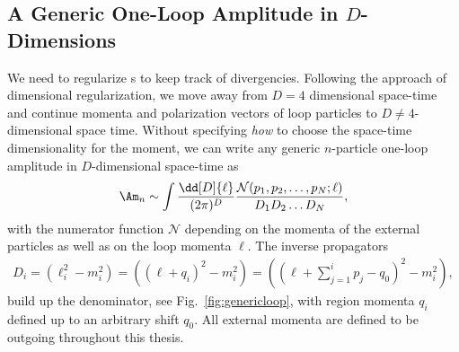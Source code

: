\subsection{A Generic One-Loop Amplitude in $D$-Dimensions}
\label{sec:genloop}
We need to regularize \ola s to keep track of divergencies. Following
the approach of dimensional regularization, we move away from $D=4$
dimensional space-time and continue momenta and polarization vectors
of loop particles to $D\neq 4$-dimensional space time. Without
specifying \textit{how} to choose the space-time dimensionality for the moment, we can write any generic $n$-particle one-loop
amplitude in $D$-dimensional space-time as
\begin{align}\label{eq:genericola}
\Am_n \sim \int \frac{\dd[D]{\ell}}{(2\pi)^{D}} \frac{\mathcal{N}(p_1,p_2,\dots,p_N;\ell)}{D_1D_2\dots D_N},
\end{align}
with the numerator function $\mathcal{N}$ depending on the
momenta of the external particles as well as on the loop momenta $\ell$. The inverse propagators 
\begin{align}\label{eq:invprop}
  D_i=\left(\ell_i^2-m_i^2\right)=\left((\ell+q_i)^2-m_i^2\right)=\left((\ell+\sum_{j=1}^ip_j-q_0)^2-m_i^2\right),
\end{align}
build up the denominator, see Fig.~\ref{fig:genericloop}, with region
momenta $q_i$ defined up to an arbitrary shift $q_0$. All external
momenta are defined to be outgoing throughout this thesis.

